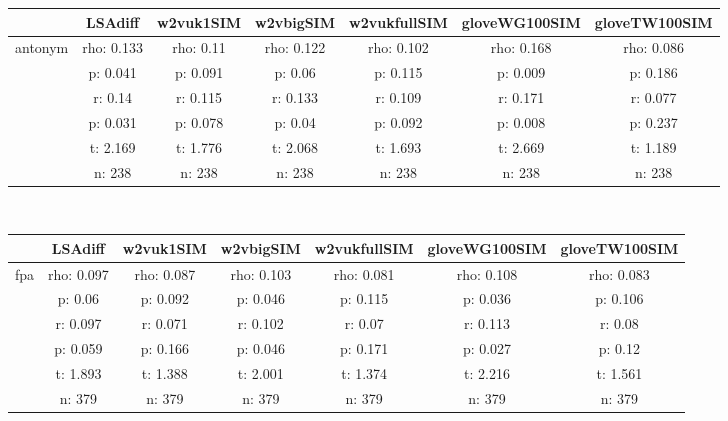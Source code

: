 \documentclass{article}
\begin{document}
\begin{tabular}{ccccccc|}\cline{2-7}
&\multicolumn{1}{|c}{LSAdiff} & w2vuk1SIM & w2vbigSIM & w2vukfullSIM & gloveWG100SIM & gloveTW100SIM \\\hline
\multicolumn{1}{|c|}{\multirow{6}{*}{antonym}} & rho: 0.133 & rho: 0.11 & rho: 0.122 & rho: 0.102 & rho: 0.168 & rho: 0.086 \\
\multicolumn{1}{|c|}{} & p: 0.041 & p: 0.091 & p: 0.06 & p: 0.115 & p: 0.009 & p: 0.186 \\
\multicolumn{1}{|c|}{} & r: 0.14 & r: 0.115 & r: 0.133 & r: 0.109 & r: 0.171 & r: 0.077 \\
\multicolumn{1}{|c|}{} & p: 0.031 & p: 0.078 & p: 0.04 & p: 0.092 & p: 0.008 & p: 0.237 \\
\multicolumn{1}{|c|}{} & t: 2.169 & t: 1.776 & t: 2.068 & t: 1.693 & t: 2.669 & t: 1.189 \\
\multicolumn{1}{|c|}{} & n: 238 & n: 238 & n: 238 & n: 238 & n: 238 & n: 238 \\
\hline
\end{tabular}\\
\begin{tabular}{ccccccc|}\cline{2-7}
&\multicolumn{1}{|c}{LSAdiff} & w2vuk1SIM & w2vbigSIM & w2vukfullSIM & gloveWG100SIM & gloveTW100SIM \\\hline
\multicolumn{1}{|c|}{\multirow{6}{*}{fpa}} & rho: 0.097 & rho: 0.087 & rho: 0.103 & rho: 0.081 & rho: 0.108 & rho: 0.083 \\
\multicolumn{1}{|c|}{} & p: 0.06 & p: 0.092 & p: 0.046 & p: 0.115 & p: 0.036 & p: 0.106 \\
\multicolumn{1}{|c|}{} & r: 0.097 & r: 0.071 & r: 0.102 & r: 0.07 & r: 0.113 & r: 0.08 \\
\multicolumn{1}{|c|}{} & p: 0.059 & p: 0.166 & p: 0.046 & p: 0.171 & p: 0.027 & p: 0.12 \\
\multicolumn{1}{|c|}{} & t: 1.893 & t: 1.388 & t: 2.001 & t: 1.374 & t: 2.216 & t: 1.561 \\
\multicolumn{1}{|c|}{} & n: 379 & n: 379 & n: 379 & n: 379 & n: 379 & n: 379 \\
\hline
\end{tabular}\\
\end{document}
